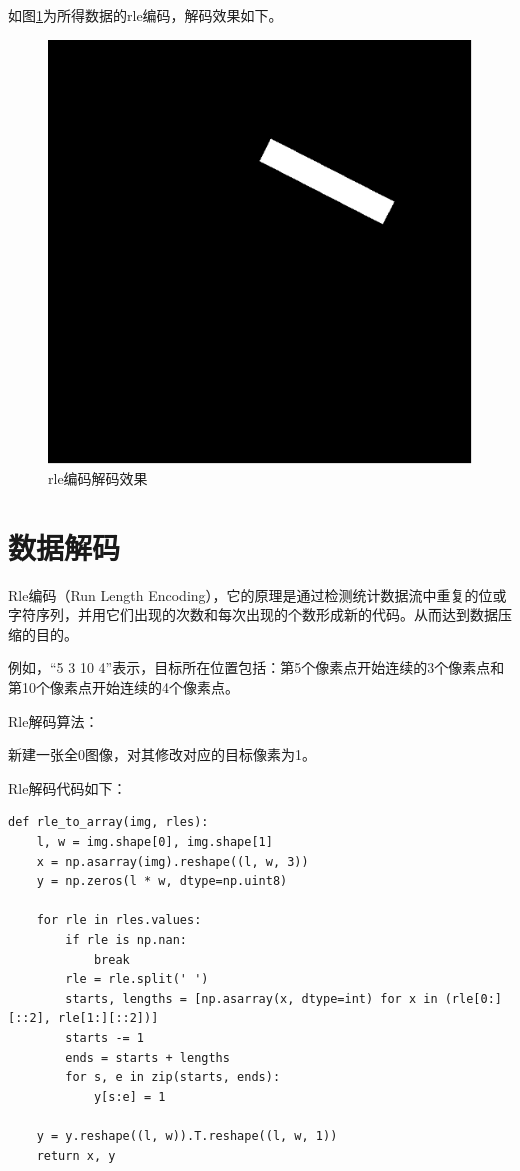 如图\ref{fig::model3}为所得数据的rle编码，解码效果如下。

\begin{figure}[htbp]
\centering
\includegraphics[width=0.6\linewidth]{body/model_pic/rle_decode}
\caption{rle编码解码效果}
\label{fig::model3}
\end{figure}

\section{数据解码}

Rle编码（Run Length
Encoding），它的原理是通过检测统计数据流中重复的位或字符序列，并用它们出现的次数和每次出现的个数形成新的代码。从而达到数据压缩的目的。

例如，``5 3 10
4''表示，目标所在位置包括：第5个像素点开始连续的3个像素点和第10个像素点开始连续的4个像素点。

Rle解码算法：

新建一张全0图像，对其修改对应的目标像素为1。

Rle解码代码如下：

\begin{lstlisting}
def rle_to_array(img, rles):
    l, w = img.shape[0], img.shape[1]
    x = np.asarray(img).reshape((l, w, 3))
    y = np.zeros(l * w, dtype=np.uint8)

    for rle in rles.values:
        if rle is np.nan:
            break
        rle = rle.split(' ')
        starts, lengths = [np.asarray(x, dtype=int) for x in (rle[0:][::2], rle[1:][::2])]
        starts -= 1
        ends = starts + lengths
        for s, e in zip(starts, ends):
            y[s:e] = 1

    y = y.reshape((l, w)).T.reshape((l, w, 1))
    return x, y
\end{lstlisting}


